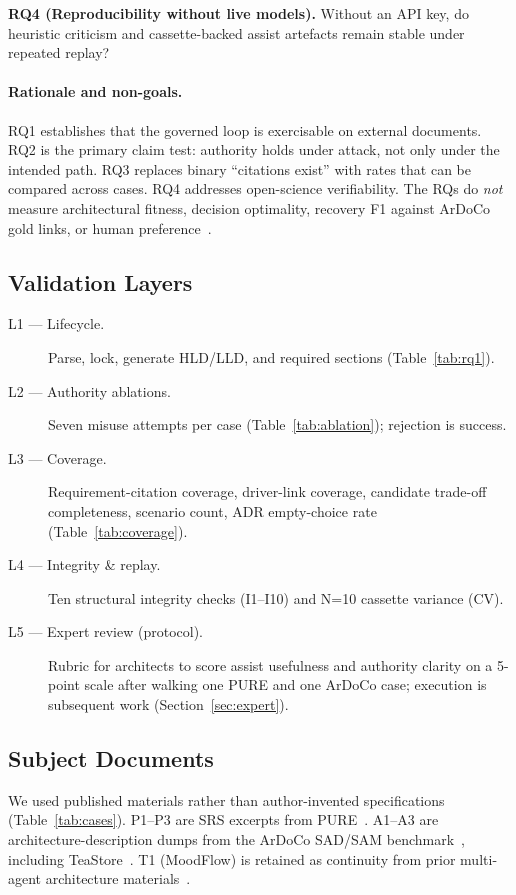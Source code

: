 \documentclass[conference]{IEEEtran}
\begin{document}
\noindent\textbf{RQ4 (Reproducibility without live models).}
Without an API key, do heuristic criticism and cassette-backed assist artefacts remain stable under repeated replay?

\paragraph{Rationale and non-goals.}
RQ1 establishes that the governed loop is exercisable on external documents.
RQ2 is the primary claim test: authority holds under attack, not only under the intended path.
RQ3 replaces binary ``citations exist'' with rates that can be compared across cases.
RQ4 addresses open-science verifiability.
The RQs do \emph{not} measure architectural fitness, decision optimality, recovery F1 against ArDoCo gold links, or human preference~\cite{waseem2026bridge,cervantes2026llms}.

\subsection{Validation Layers}
\begin{description}
\item[L1 --- Lifecycle.] Parse, lock, generate HLD/LLD, and required sections (Table~\ref{tab:rq1}).
\item[L2 --- Authority ablations.] Seven misuse attempts per case (Table~\ref{tab:ablation}); rejection is success.
\item[L3 --- Coverage.] Requirement-citation coverage, driver-link coverage, candidate trade-off completeness, scenario count, ADR empty-choice rate (Table~\ref{tab:coverage}).
\item[L4 --- Integrity \& replay.] Ten structural integrity checks (I1--I10) and N=10 cassette variance (CV).
\item[L5 --- Expert review (protocol).] Rubric for architects to score assist usefulness and authority clarity on a 5-point scale after walking one PURE and one ArDoCo case; execution is subsequent work (Section~\ref{sec:expert}).
\end{description}

\subsection{Subject Documents}
We used published materials rather than author-invented specifications (Table~\ref{tab:cases}).
P1--P3 are SRS excerpts from PURE~\cite{ferrari2017pure}.
A1--A3 are architecture-description dumps from the ArDoCo SAD/SAM benchmark~\cite{fuchss2023ardoco}, including TeaStore~\cite{kistowski2018teastore}.
T1 (MoodFlow) is retained as continuity from prior multi-agent architecture materials~\cite{zenodo2026timearch}.
\end{document}
